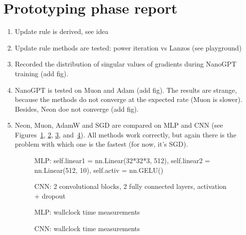 \documentclass[]{scrartcl}
\begin{document}
\section{Prototyping phase report}
\begin{enumerate}
    \item Update rule is derived, see idea
    \item Update rule methods are tested: power iteration vs Lanzos (see playground)
    \item Recorded the distribution of singular values of gradients during NanoGPT training (add fig).
    \item NanoGPT is tested on Muon and Adam (add fig). The results are strange, because the methods do not converge at the expected rate (Muon is slower). Besides, Neon doe not converge (add fig).
    \item Neon, Muon, AdamW and SGD are compared on MLP and CNN (see Figures~\ref{fig:mlp_epochs}, \ref{fig:cnn_epochs}, \ref{fig:mlp_time}, and~\ref{fig:cnn_time}). All methods work correctly, but again there is the problem with which one is the fastest (for now, it's SGD).
    \begin{figure}[h!]
        \caption{MLP: self.linear1 = nn.Linear(32*32*3, 512), self.linear2 = nn.Linear(512, 10), self.activ = nn.GELU()}
        \label{fig:mlp_epochs}
    \end{figure}
    \begin{figure}[h!]
        \caption{CNN: 2 convolutional blocks, 2 fully connected layers, activation + dropout}
        \label{fig:cnn_epochs}
    \end{figure}
    \begin{figure}[h!]
        \caption{MLP: wallclock time measurements}
        \label{fig:mlp_time}
    \end{figure}
    \begin{figure}[h!]
        \caption{CNN: wallclock time measurements}
        \label{fig:cnn_time}
    \end{figure}
\end{enumerate}

\end{document}
